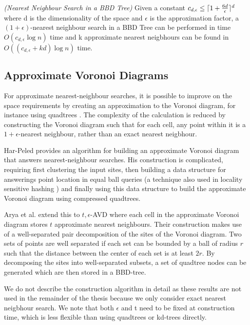 \documentclass[mcs]{scsthesis}
\begin{document}
\begin{thm} \emph{(Nearest Neighbour Search in a BBD Tree)} 
Given a constant \(c_{d,\epsilon} \le \lceil 1 + {6d \over \epsilon} \rceil^d\)
where d is the dimensionality of the space and \(\epsilon\) is the approximation
factor, a \((1 + \epsilon)\)-nearest neighbour search in a BBD Tree can be
performed in time \(O(c_{d,\epsilon} \log n)\) time and k approximate nearest
neigbhours can be found in \(O((c_{d,\epsilon} + kd) \log n)\) time.
\end{thm}

\subsection{Approximate Voronoi Diagrams}

For approximate nearest-neighbour searches, it is possible to improve on the
space requirements by creating an approximation to the Voronoi diagram, for
instance using quadtrees \cite{avd}. The complexity of the calculation is
reduced by constructing the Voronoi diagram such that for each cell, any point
within it is a \(1 + \epsilon\)-nearest neighbour, rather than an exact
nearest neigbhour.

Har-Peled \cite{avd} provides an algorithm for building an approximate
Voronoi diagram that answers nearest-neighbour searches. His construction is
complicated, requiring first clustering the input sites, then
building a data structure for answerings point location in equal ball queries
(a technique also used in locality sensitive hashing \cite{lsh}) and finally
using this data structure to build the approximate Voronoi diagram using
compressed quadtrees.

Arya et al. \cite{arya-avd} extend this to \(t, \epsilon\)-AVD where each
cell in the approximate Voronoi diagram stores \(t\) approximate nearest
neighbours. Their construction makes use of a well-separated pair
decomposition of the sites of the Voronoi diagram. Two sets of points are well
separated if each set can be bounded by a ball of radius \(r\) such that the
distance between the center of each set is at least \(2r\). By decomposing
the sites into well-separated subsets, a set of quadtree nodes can be
generated which are then stored in a BBD-tree. 

We do not describe the construction algorithm in detail as these results are
not used in the remainder of the thesis because we only consider exact
nearest neigbhour search. We note that both \(\epsilon\) and t need to be fixed
at construction time, which is less flexible than using quadtrees or kd-trees
directly.
\end{document}

